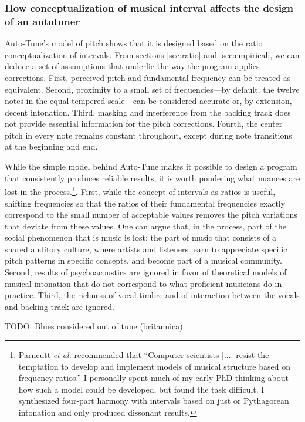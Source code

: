 \subsubsection{How conceptualization of musical interval affects the design of an autotuner}
Auto-Tune's model of pitch shows that it is designed based on the ratio conceptualization of intervals. From sections \ref{sec:ratio} and \ref{sec:empirical}, we can deduce a set of assumptions that underlie the way the program applies corrections. First, perceived pitch and fundamental frequency can be treated as equivalent. Second, proximity to a small set of frequencies---by default, the twelve notes in the equal-tempered scale---can be considered accurate or, by extension, decent intonation. Third, masking and interference from the backing track does not provide essential information for the pitch corrections. Fourth, the center pitch in every note remains constant throughout, except during note transitions at the beginning and end. 

While the simple model behind Auto-Tune makes it possible to design a program that consistently produces reliable results, it is worth pondering what nuances are lost in the process.\footnote{Parncutt \textit{et al.} recommended that ``Computer scientists [...] resist the temptation to develop and implement models of musical structure based on frequency ratios.'' I personally spent much of my early PhD thinking about how such a model could be developed, but found the task difficult. I synthesized four-part harmony with intervals based on just or Pythagorean intonation and only produced dissonant results.}. First, while the concept of intervals as ratios is useful, shifting frequencies so that the ratios of their fundamental frequencies exactly correspond to the small number of acceptable values removes the pitch variations that deviate from these values. One can argue that, in the process, part of the social phenomenon that is music is lost: the part of music that consists of a shared auditory culture, where artists and listeners learn to appreciate specific pitch patterns in specific concepts, and become part of a musical community. Second, results of psychoacoustics are ignored in favor of theoretical models of musical intonation that do not correspond to what proficient musicians do in practice. Third, the richness of vocal timbre and of interaction between the vocals and backing track are ignored. 

TODO: Blues considered out of tune (britannica).
 
